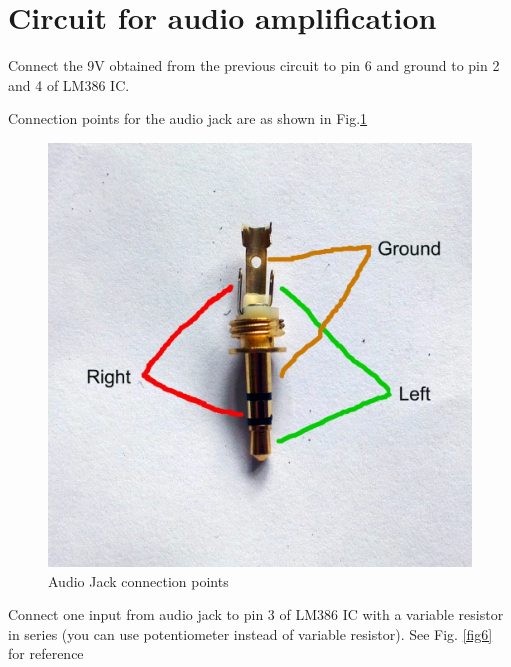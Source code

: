 \documentclass[journal,12pt,twocolumn]{IEEEtran}
\begin{document}
\section{Circuit for audio amplification}

\begin{problem}
Connect the 9V obtained from the previous circuit to pin 6  and ground to pin 2 and 4 of LM386 IC.
\end{problem}
\begin{problem}
Connection points for the audio jack are as shown in Fig.\ref{fig5}
\end{problem}
\begin{figure}[h]
\centering
	\includegraphics[scale=0.2]{./figs/jack.jpg}
	\caption{Audio Jack connection points}  \label{fig5}
    \end{figure}
\begin{problem}
Connect one input from audio jack to pin 3 of LM386 IC with a variable resistor in series (you can use potentiometer instead of variable resistor). See Fig. \ref{fig6} for reference
\end{problem}
\end{document}
